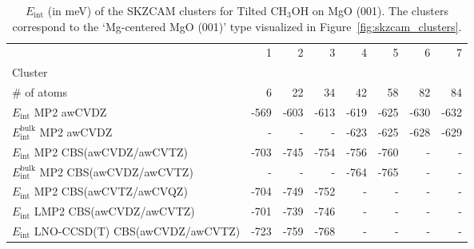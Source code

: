 \begin{table}
\caption{\label{tab:system_eint_mgo_ch3oh_tilted}$E_\textrm{int}$ (in meV) of the SKZCAM clusters for Tilted CH$_3$OH on MgO (001). The clusters correspond to the `Mg-centered MgO (001)' type visualized in Figure~\ref{fig:skzcam_clusters}.}
\begin{adjustbox}{center,max width=1.4\textwidth}
\begin{tabular}{lrrrrrrr}
\toprule
 & 1 & 2 & 3 & 4 & 5 & 6 & 7 \\ 
Cluster &  &  &  &  &  &  &  \\
\midrule
\# of atoms & 6 & 22 & 34 & 42 & 58 & 82 & 84 \\
$E_\textrm{int}$ MP2 awCVDZ & -569 & -603 & -613 & -619 & -625 & -630 & -632 \\
$E_\textrm{int}^\textrm{bulk}$ MP2 awCVDZ & - & - & - & -623 & -625 & -628 & -629 \\
$E_\textrm{int}$ MP2 CBS(awCVDZ/awCVTZ) & -703 & -745 & -754 & -756 & -760 & - & - \\
$E_\textrm{int}^\textrm{bulk}$ MP2 CBS(awCVDZ/awCVTZ) & - & - & - & -764 & -765 & - & - \\
$E_\textrm{int}$ MP2 CBS(awCVTZ/awCVQZ) & -704 & -749 & -752 & - & - & - & - \\
$E_\textrm{int}$ LMP2 CBS(awCVDZ/awCVTZ) & -701 & -739 & -746 & - & - & - & - \\
$E_\textrm{int}$ LNO-CCSD(T) CBS(awCVDZ/awCVTZ) & -723 & -759 & -768 & - & - & - & - \\
\bottomrule
\end{tabular}
\end{adjustbox}
\end{table}

